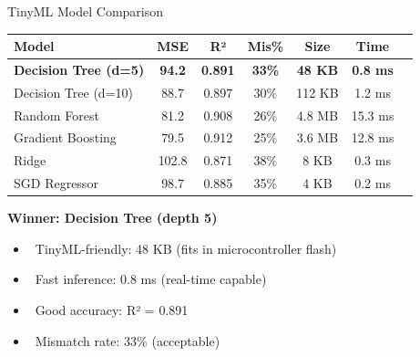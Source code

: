 \documentclass[aspectratio=169]{beamer}
\begin{document}
\begin{frame}{TinyML Model Comparison}
\begin{table}
\centering
\scriptsize
\begin{tabular}{lcccccc}
\toprule
\textbf{Model} & \textbf{MSE} & \textbf{R²} & \textbf{Mis\%} & \textbf{Size} & \textbf{Time} \\
\midrule
\rowcolor{iiitlgreen!20}
\textbf{Decision Tree (d=5)} & \textbf{94.2} & \textbf{0.891} & \textbf{33\%} & \textbf{48 KB} & \textbf{0.8 ms} \\
Decision Tree (d=10) & 88.7 & 0.897 & 30\% & 112 KB & 1.2 ms \\
Random Forest & 81.2 & 0.908 & 26\% & 4.8 MB & 15.3 ms \\
Gradient Boosting & 79.5 & 0.912 & 25\% & 3.6 MB & 12.8 ms \\
Ridge & 102.8 & 0.871 & 38\% & 8 KB & 0.3 ms \\
SGD Regressor & 98.7 & 0.885 & 35\% & 4 KB & 0.2 ms \\
\bottomrule
\end{tabular}
\end{table}

\vspace{0.3cm}
\textbf{Winner: Decision Tree (depth 5)}
\begin{itemize}
    \item \checkmark\ TinyML-friendly: 48 KB (fits in microcontroller flash)
    \item \checkmark\ Fast inference: 0.8 ms (real-time capable)
    \item \checkmark\ Good accuracy: R² = 0.891
    \item \checkmark\ Mismatch rate: 33\% (acceptable)
\end{itemize}
\end{frame}
\end{document}
